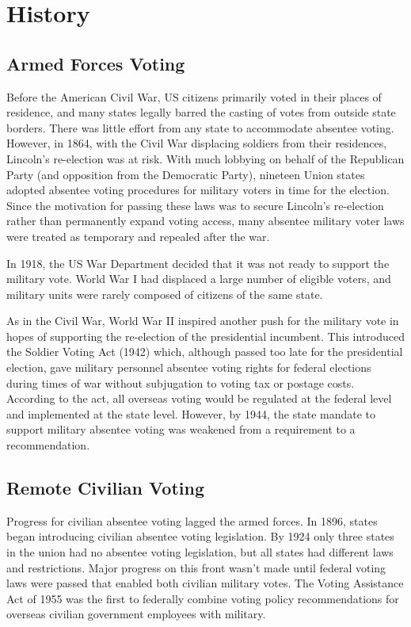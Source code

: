 \section{History}
\subsection{Armed Forces Voting}
Before the American Civil War, US citizens primarily voted in their
places of residence, and many states legally barred the casting of
votes from outside state borders. There was little effort from any
state to accommodate absentee voting. However, in 1864, with the Civil
War displacing soldiers from their residences, Lincoln's re-election
was at risk. With much lobbying on behalf of the Republican Party (and
opposition from the Democratic Party), nineteen Union states adopted
absentee voting procedures for military voters in time for the
election. Since the motivation for passing these laws was to secure
Lincoln's re-election rather than permanently expand voting access,
many absentee military voter laws were treated as temporary and
repealed after the war.

In 1918, the US War Department decided that it was not ready to
support the military vote. World War I had displaced a large number of
eligible voters, and military units were rarely composed of citizens
of the same state. 

As in the Civil War, World War II inspired another push for the
military vote in hopes of supporting the re-election of the
presidential incumbent. This introduced the Soldier Voting Act (1942)
which, although passed too late for the presidential election, gave
military personnel absentee voting rights for federal elections during
times of war without subjugation to voting tax or postage
costs. According to the act, all overseas voting would be regulated at
the federal level and implemented at the state level. However, by
1944, the state mandate to support military absentee voting was
weakened from a requirement to a recommendation.

\subsection{Remote Civilian Voting}

Progress for civilian absentee voting lagged the armed forces. In 1896, states
began introducing civilian absentee voting legislation. By 1924 only three
states in the union had no absentee voting legislation, but all states had
different laws and restrictions. Major progress on this front wasn't made until
federal voting laws were passed that enabled both civilian military votes.
The Voting Assistance Act of 1955 was the first to federally
combine voting policy recommendations for overseas civilian government
employees with military.


